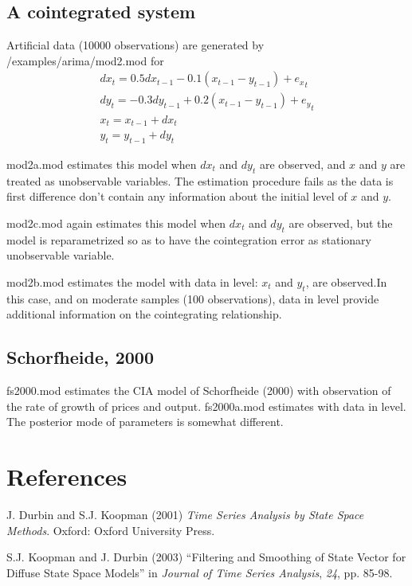 \documentclass{article}
\begin{document}
\subsection{A cointegrated system} 

Artificial data (10000 observations) are generated by /examples/arima/mod2.mod for
\begin{eqnarray*}
  dx_t = 0.5dx_{t-1}-0.1(x_{t-1}-y_{t-1})+{e_x}_t\\
  dy_t = -0.3dy_{t-1}+0.2(x_{t-1}-y_{t-1})+{e_y}_t\\
  x_t = x_{t-1}+dx_t\\
  y_t = y_{t-1}+dy_t
\end{eqnarray*}

mod2a.mod estimates this model when $dx_t$ and $dy_t$ are observed, and $x$ and $y$ are treated as unobservable variables. The estimation procedure fails as the data is first difference don't contain any information about the initial level of $x$ and $y$.

mod2c.mod again estimates this model when $dx_t$ and $dy_t$ are observed, but the model is reparametrized so as to have the cointegration error as stationary unobservable variable.

mod2b.mod estimates the model with data in level: $x_t$ and $y_t$, are observed.In this case, and on moderate samples (100 observations), data in level provide additional information on the cointegrating relationship. 

\subsection{Schorfheide, 2000}

fs2000.mod estimates the CIA model of Schorfheide (2000) with observation of the rate of growth of prices and output. fs2000a.mod estimates with data in level. The posterior mode of parameters is somewhat different.


\section*{References}
\begin{description}
\item J. Durbin and S.J. Koopman (2001) \emph{Time Series Analysis by State Space Methods}. Oxford: Oxford University Press.
\item S.J. Koopman and J. Durbin (2003) ``Filtering and Smoothing of State Vector for Diffuse State Space Models'' in \emph{Journal of Time Series Analysis}, \emph{24}, pp. 85-98.  
\end{description}

 
\end{document}
